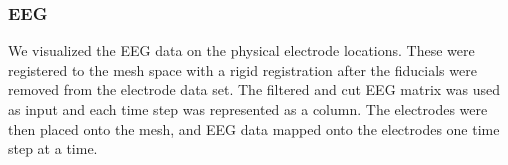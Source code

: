 \subsubsection{EEG}

We visualized the EEG data on the physical electrode locations. These were registered to the mesh space with a rigid registration after the fiducials were removed from the electrode data set. The filtered and cut EEG matrix was used as input and each time step was represented as a column. The electrodes were then placed onto the mesh, and EEG data mapped onto the electrodes one time step at a time. 


